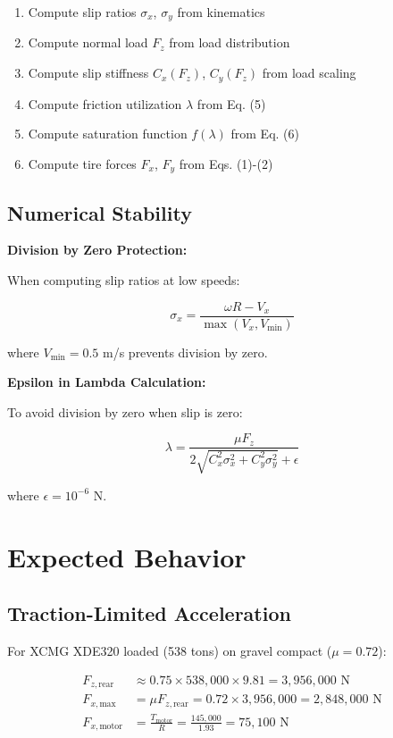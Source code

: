 \documentclass[11pt,a4paper]{article}
\begin{document}
\begin{enumerate}
    \item Compute slip ratios $\sigma_x$, $\sigma_y$ from kinematics
    \item Compute normal load $F_z$ from load distribution
    \item Compute slip stiffness $C_x(F_z)$, $C_y(F_z)$ from load scaling
    \item Compute friction utilization $\lambda$ from Eq. (5)
    \item Compute saturation function $f(\lambda)$ from Eq. (6)
    \item Compute tire forces $F_x$, $F_y$ from Eqs. (1)-(2)
\end{enumerate}

\subsection{Numerical Stability}

\textbf{Division by Zero Protection:}

When computing slip ratios at low speeds:

\begin{equation}
\sigma_x = \frac{\omega R - V_x}{\max(V_x, V_{\text{min}})}
\end{equation}

where $V_{\text{min}} = 0.5$ m/s prevents division by zero.

\textbf{Epsilon in Lambda Calculation:}

To avoid division by zero when slip is zero:

\begin{equation}
\lambda = \frac{\mu F_z}{2\sqrt{C_x^2 \sigma_x^2 + C_y^2 \sigma_y^2} + \epsilon}
\end{equation}

where $\epsilon = 10^{-6}$ N.

\section{Expected Behavior}

\subsection{Traction-Limited Acceleration}

For XCMG XDE320 loaded (538 tons) on gravel compact ($\mu = 0.72$):

\begin{align}
F_{z,\text{rear}} &\approx 0.75 \times 538{,}000 \times 9.81 = 3{,}956{,}000 \text{ N} \\
F_{x,\text{max}} &= \mu F_{z,\text{rear}} = 0.72 \times 3{,}956{,}000 = 2{,}848{,}000 \text{ N} \\
F_{x,\text{motor}} &= \frac{T_{\text{motor}}}{R} = \frac{145{,}000}{1.93} = 75{,}100 \text{ N}
\end{align}
\end{document}
